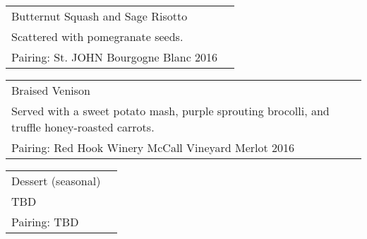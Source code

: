 \documentclass[12pt]{article}
\makeatletter
\newcommand*\ColText[1]{\textcolor{Goldenrod3}{#1}}
\newenvironment{Group}[1]
  {\noindent\begin{tabular*}{\textwidth}{@{}p{.8\linewidth}@{\extracolsep{\fill}}r@{}}
    {\fontsize{18}{29}\selectfont\ColText{#1}}\\[0.8em]}
  {\end{tabular*}}
\newcommand*\Entry[2]{%
  \sffamily#1 & #2}
\newcommand*\Expl[1]{%
  \hspace*{1em}\footnotesize #1}
\makeatother
\begin{document}
\vspace*{80pt}
\hspace{2em}
\begin{Group}{Butternut Squash and Sage Risotto}
\Entry{Scattered with pomegranate seeds.}{} \\
\Expl{Pairing: St. JOHN Bourgogne Blanc 2016} \\
\end{Group}

\vfill
\hspace{2em}
\begin{Group}{Braised Venison}
\Entry{Served with a sweet potato mash, purple sprouting brocolli, and truffle honey-roasted carrots.}{} \\
\Expl{Pairing: Red Hook Winery McCall Vineyard Merlot 2016 } \\
\end{Group}

\vfill
\hspace{2em}
\begin{Group}{Dessert (seasonal)}
\Entry{TBD}{} \\
\Expl{Pairing: TBD} \\
\end{Group}

\vfill
\end{document}
